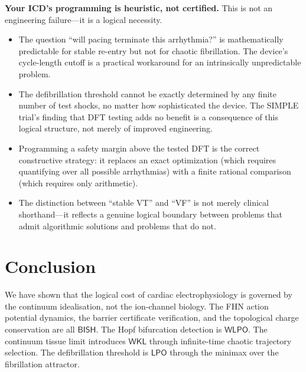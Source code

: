 \documentclass[11pt,a4paper]{article}
\theoremstyle{plain}
\theoremstyle{definition}
\newcommand{\BISH}{\textsf{BISH}}
\newcommand{\WKL}{\textsf{WKL}}
\newcommand{\WLPO}{\textsf{WLPO}}
\newcommand{\LPO}{\textsf{LPO}}
\begin{document}
\begin{tcolorbox}[colback=blue!5!white, colframe=blue!50!black,
  title={\textbf{What This Means for a Clinician}}, fonttitle=\bfseries]

\textbf{Your ICD's programming is heuristic, not certified.}  This is not an engineering failure---it is a logical necessity.

\begin{itemize}[nosep]
\item The question ``will pacing terminate this arrhythmia?'' is mathematically predictable for stable re-entry but not for chaotic fibrillation.  The device's cycle-length cutoff is a practical workaround for an intrinsically unpredictable problem.

\item The defibrillation threshold cannot be exactly determined by any finite number of test shocks, no matter how sophisticated the device.  The SIMPLE trial's finding that DFT testing adds no benefit is a consequence of this logical structure, not merely of improved engineering.

\item Programming a safety margin above the tested DFT is the correct constructive strategy: it replaces an exact optimization (which requires quantifying over all possible arrhythmias) with a finite rational comparison (which requires only arithmetic).

\item The distinction between ``stable VT'' and ``VF'' is not merely clinical shorthand---it reflects a genuine logical boundary between problems that admit algorithmic solutions and problems that do not.
\end{itemize}
\end{tcolorbox}


\section{Conclusion}\label{sec:conclusion}

We have shown that the logical cost of cardiac electrophysiology is governed by the continuum idealisation, not the ion-channel biology.  The FHN action potential dynamics, the barrier certificate verification, and the topological charge conservation are all $\BISH$.  The Hopf bifurcation detection is $\WLPO$.  The continuum tissue limit introduces $\WKL$ through infinite-time chaotic trajectory selection.  The defibrillation threshold is $\LPO$ through the minimax over the fibrillation attractor.
\end{document}
